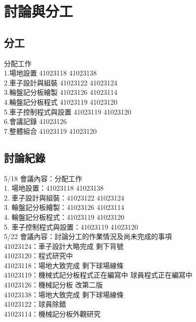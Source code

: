 \chapter{討論與分工}
\renewcommand{\baselinestretch}{10.0} %
\setcounter{page}{24}  %
\fontsize{14pt}{2.5pt}\sectionef
\section{分工}

分配工作\\
1.場地設置 41023118 41023138\\
2.車子設計與組裝 41023122 41023124\\
3.輪盤記分板繪製 41023126 41023114\\
4.輪盤記分板程式 41023119 41023120\\
5.車子控制程式與設置 41023119 41023120\\
6.會議記錄 41023126\\
7.整體組合 41023119 41023120\\

\section{討論紀錄}

5/18 會議內容：分配工作\\
1. 場地設置：41023118 41023138\\
2. 車子設計與組裝：41023122 41023124\\
3. 輪盤記分板繪製：41023126 41023114\\
4. 輪盤記分板程式：41023119 41023120\\
5. 車子控制程式與設置：41023119 41023120\\

5/22 會議內容：討論分工的作業情況及尚未完成的事項\\
41023124：車子設計大略完成 剩下背號\\
41023120：程式研究中\\
41023118：場地大致完成 剩下球場線條\\
41023119：機械式記分板程式正在編寫中 球員程式正在編寫中\\
41023126：機械記分板 改第二版\\
41023138：場地大致完成 剩下球場線條\\
41023122：球員除錯\\
41023114：機械記分板外觀研究\\

